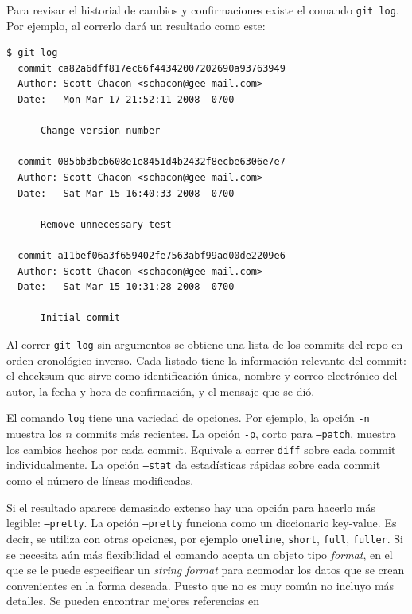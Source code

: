 \documentclass[spanish, 12pt, a4paper]{article}
\begin{document}
Para revisar el historial de cambios y confirmaciones existe el comando \texttt{git log}.
Por ejemplo, al correrlo dará un resultado como este:
\begin{lstlisting}
$ git log
  commit ca82a6dff817ec66f44342007202690a93763949
  Author: Scott Chacon <schacon@gee-mail.com>
  Date:   Mon Mar 17 21:52:11 2008 -0700
  
      Change version number
  
  commit 085bb3bcb608e1e8451d4b2432f8ecbe6306e7e7
  Author: Scott Chacon <schacon@gee-mail.com>
  Date:   Sat Mar 15 16:40:33 2008 -0700

      Remove unnecessary test

  commit a11bef06a3f659402fe7563abf99ad00de2209e6
  Author: Scott Chacon <schacon@gee-mail.com>
  Date:   Sat Mar 15 10:31:28 2008 -0700

      Initial commit
\end{lstlisting}

Al correr \texttt{git log} sin argumentos se obtiene una lista de los commits del repo en orden cronológico inverso.
Cada listado tiene la información relevante del commit: el checksum que sirve como identificación única, nombre y correo electrónico del autor, la fecha y hora de confirmación, y el mensaje que se dió.

El comando \texttt{log} tiene una variedad de opciones.
Por ejemplo, la opción \texttt{-n} muestra los $n$ commits más recientes.
La opción \texttt{-p}, corto para \texttt{--patch}, muestra los cambios hechos por cada commit.
Equivale a correr \texttt{diff} sobre cada commit individualmente.
La opción \texttt{--stat} da estadísticas rápidas sobre cada commit como el número de líneas modificadas.

Si el resultado aparece demasiado extenso hay una opción para hacerlo más legible: \texttt{--pretty}.
La opción \texttt{--pretty} funciona como un diccionario key-value.
Es decir, se utiliza con otras opciones, por ejemplo \texttt{oneline}, \texttt{short}, \texttt{full}, \texttt{fuller}.
Si se necesita aún más flexibilidad el comando acepta un objeto tipo \textit{format}, en el que se le puede especificar un \textit{string format} para acomodar los datos que se crean convenientes en la forma deseada.
Puesto que no es muy común no incluyo más detalles. Se pueden encontrar mejores referencias en \cite[pág.~88]{chacon-2009}
\end{document}
